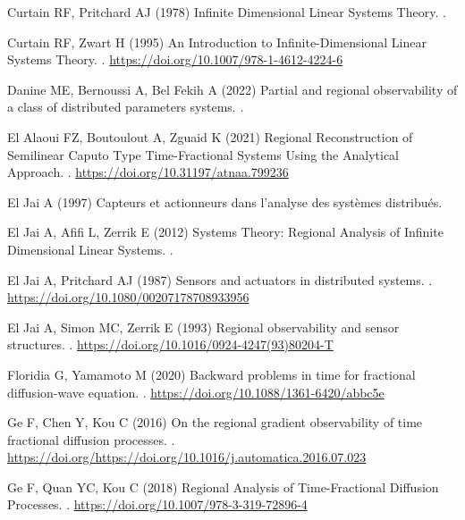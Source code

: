 \documentclass{article}
\begin{document}
\begin{thebibliography}{xx}
Curtain RF, Pritchard AJ (1978) 
\newblock Infinite Dimensional Linear Systems Theory. 
.

Curtain RF, Zwart H (1995) 
\newblock An Introduction to Infinite-Dimensional Linear Systems Theory. 
. 
\url{https://doi.org/10.1007/978-1-4612-4224-6}

Danine ME, Bernoussi A, Bel Fekih A (2022) 
\newblock Partial and regional observability of a class of distributed parameters systems.
.

El Alaoui FZ, Boutoulout A, Zguaid K (2021) 
\newblock Regional Reconstruction of Semilinear Caputo Type 
Time-Fractional Systems Using the Analytical Approach.
. 
\url{https://doi.org/10.31197/atnaa.799236}

El Jai A (1997) 
\newblock Capteurs et actionneurs dans l'analyse des syst\`{e}mes distribu\'{e}s. 

El Jai A, Afifi L, Zerrik E (2012) 
\newblock Systems Theory: Regional Analysis of Infinite Dimensional Linear Systems.
.

El Jai A, Pritchard AJ (1987)
\newblock Sensors and actuators in distributed systems.
.
\url{https://doi.org/10.1080/00207178708933956}

El Jai A, Simon MC, Zerrik E (1993) 
\newblock Regional observability and sensor structures.
.
\url{https://doi.org/10.1016/0924-4247(93)80204-T}

Floridia G, Yamamoto M (2020)  
\newblock Backward problems in time for fractional diffusion-wave equation.
.
\url{https://doi.org/10.1088/1361-6420/abbc5e}

Ge F, Chen Y, Kou C (2016)
\newblock On the regional gradient observability of time fractional diffusion processes.
. 
\url{https://doi.org/https://doi.org/10.1016/j.automatica.2016.07.023}

Ge F, Quan YC, Kou C (2018)
\newblock Regional Analysis of Time-Fractional Diffusion Processes.
.
\url{https://doi.org/10.1007/978-3-319-72896-4}


\end{thebibliography}
\end{document}
